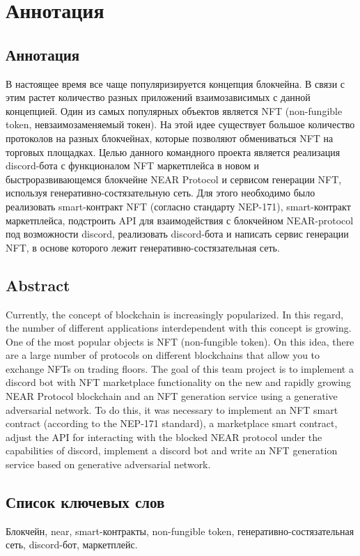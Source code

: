 \section*{Аннотация}

\subsection*{Аннотация}

В настоящее время все чаще популяризируется концепция блокчейна. В связи с этим растет количество разных приложений взаимозависимых с данной концепцией. Один из самых популярных объектов является NFT (non-fungible token, невзаимозаменяемый токен). На этой идее существует большое количество протоколов на разных блокчейнах, которые позволяют обмениваться NFT на торговых площадках. Целью данного командного проекта является реализация discord-бота с функционалом NFT маркетплейса в новом и быстроразвивающемся блокчейне NEAR Protocol и сервисом генерации NFT, используя генеративно-состязательную сеть. Для этого необходимо было реализовать smart-контракт NFT (согласно стандарту NEP-171), smart-контракт маркетплейса, подстроить API для взаимодействия с блокчейном NEAR-protocol под возможности discord, реализовать discord-бота и написать сервис генерации NFT, в основе которого лежит генеративно-состязательная сеть.

\subsection*{Abstract}
Currently, the concept of blockchain is increasingly popularized. In this regard, the number of different applications interdependent with this concept is growing. One of the most popular objects is NFT (non-fungible token). On this idea, there are a large number of protocols on different blockchains that allow you to exchange NFTs on trading floors. The goal of this team project is to implement a discord bot with NFT marketplace functionality on the new and rapidly growing NEAR Protocol blockchain and an NFT generation service using a generative adversarial network. To do this, it was necessary to implement an NFT smart contract (according to the NEP-171 standard), a marketplace smart contract, adjust the API for interacting with the blocked NEAR protocol under the capabilities of discord, implement a discord bot and write an NFT generation service based on generative adversarial network.

\subsection*{Список ключевых слов}
Блокчейн, near, smart-контракты, non-fungible token, генеративно-состязательная сеть, discord-бот, маркетплейс.

\newpage
